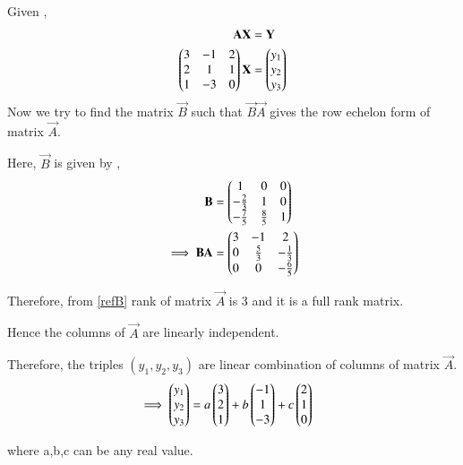 
Given , 
\begin{align}
    \mathbf{A}\mathbf{X}&=\mathbf{Y}\label{system}\\
    \begin{pmatrix}3 & -1 & 2\\2 & 1 & 1\\1 & -3 & 0\end{pmatrix}\mathbf{X}&=\begin{pmatrix}y_1 \\y_2\\y_3\end{pmatrix}\label{given}
\end{align}
Now we try to find the matrix $\vec{B}$ such that $\vec{B}\vec{A}$ gives the row echelon form of matrix $\vec{A}$.

Here, $\vec{B}$ is given by , 
\begin{align}
    \mathbf{B}&=\begin{pmatrix}1&0&0\\-\frac{2}{3}&1&0\\-\frac{7}{5}&\frac{8}{5}&1\end{pmatrix}\label{B}\\
    \implies\mathbf{B}\mathbf{A}&=\begin{pmatrix}3 & -1 & 2\\0 & \frac{5}{3} & -\frac{1}{3}\\0 & 0 & -\frac{6}{5}\end{pmatrix}\label{refB}
\end{align}

Therefore, from \eqref{refB} rank of matrix $\vec{A}$ is 3 and it is a full rank matrix.

Hence the columns of $\vec{A}$ are linearly independent.

Therefore, the triples $(y_1,y_2,y_3)$ are linear combination of columns of matrix $\vec{A}$.
\begin{align}
    \implies\begin{pmatrix}y_1\\y_2\\y_3\end{pmatrix}&=a\begin{pmatrix}3\\2\\1\end{pmatrix}+b\begin{pmatrix}-1\\1\\-3\end{pmatrix}+c\begin{pmatrix}2\\1\\0\end{pmatrix}
\end{align}

where a,b,c can be any real value.
